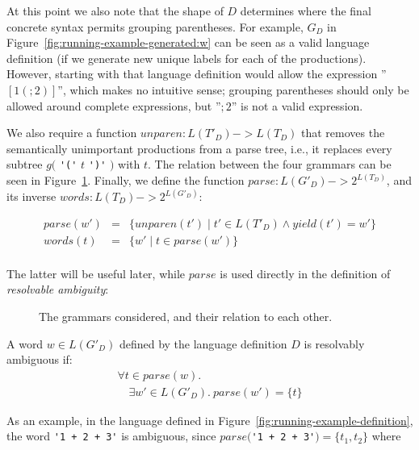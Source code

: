\documentclass[acmsmall,review,anonymous]{acmart}\settopmatter{printfolios=true,printccs=false,printacmref=false}
\newcommand{\yield}{\mathit{yield}} %
\newcommand{\semantic}{\mathit{unparen}} %
\newcommand{\parse}{\mathit{parse}} %
\newcommand{\words}{\mathit{words}} %
\begin{document}
At this point we also note that the shape of $D$ determines where the final concrete syntax permits grouping parentheses. For example, $G_D$ in Figure~\ref{fig:running-example-generated:w} can be seen as a valid language definition (if we generate new unique labels for each of the productions). However, starting with that language definition would allow the expression ''$[1(;2)]$'', which makes no intuitive sense; grouping parentheses should only be allowed around complete expressions, but ''$;2$'' is not a valid expression.

We also require a function $\semantic : L(T'_D) -> L(T_D)$ that removes the semantically unimportant productions from a parse tree, i.e., it replaces every subtree $g($ \verb|'('| $t$ \verb|')'| $)$ with $t$. The relation between the four grammars can be seen in Figure~\ref{fig:grammar-square}. Finally, we define the function $\parse : L(G'_D) -> 2^{L(T_D)}$, and its inverse $\words : L(T_D) -> 2^{L(G'_D)}$:

$$
\begin{array}{rcl}
\parse(w') & = & \{ \semantic(t') \mid t' \in L(T'_D) \land \yield(t') = w' \} \\
\words(t) & = & \{ w' \mid t \in \parse(w') \} \\
\end{array}
$$

\noindent The latter will be useful later, while $\parse$ is used directly in the definition of \emph{resolvable ambiguity}:

\begin{figure}
  \caption{The grammars considered, and their relation to each other.}
  \label{fig:grammar-square}
\end{figure}

\begin{definition}
  A word $w \in L(G'_D)$ defined by the language definition $D$ is resolvably ambiguous if:
  $$
  \begin{array}{l}
  \forall t \in \parse(w).\\
  \quad \exists w' \in L(G'_D).\ \parse(w') = \{t\}
  \end{array}
  $$
\end{definition}

\noindent As an example, in the language defined in Figure~\ref{fig:running-example-definition}, the word \verb|'1 + 2 + 3'| is ambiguous, since $\parse($\verb|'1 + 2 + 3'|$) = \{t_1, t_2\}$ where
\end{document}
